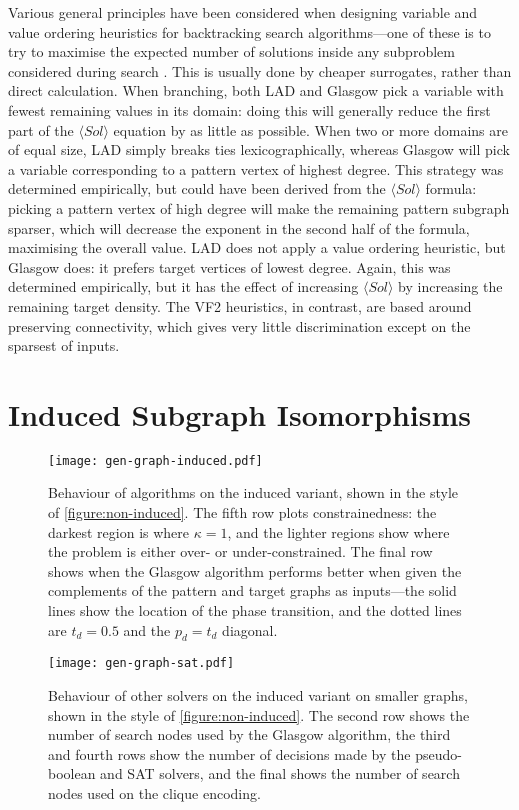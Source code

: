 \documentclass[twoside,11pt]{article}
\newcommand{\citep}[1]{\cite{#1}}
\begin{document}
Various general principles have been considered when designing variable and value ordering
heuristics for backtracking search algorithms---one of these is to try to maximise the expected
number of solutions inside any subproblem considered during search \citep{Gent:1996:EN}.  This is
usually done by cheaper surrogates, rather than direct calculation. When branching, both LAD and
Glasgow pick a variable with fewest remaining values in its domain: doing this will generally reduce
the first part of the $\langle Sol \rangle$ equation by as little as possible. When two or more
domains are of equal size, LAD simply breaks ties lexicographically, whereas Glasgow will pick a
variable corresponding to a pattern vertex of highest degree. This strategy was determined
empirically, but could have been derived from the $\langle Sol \rangle$ formula: picking a pattern
vertex of high degree will make the remaining pattern subgraph sparser, which will decrease the
exponent in the second half of the formula, maximising the overall value. LAD does not apply a value
ordering heuristic, but Glasgow does: it prefers target vertices of lowest degree.  Again, this was
determined empirically, but it has the effect of increasing $\langle Sol \rangle$ by increasing the
remaining target density. The VF2 heuristics, in contrast, are based around preserving connectivity,
which gives very little discrimination except on the sparsest of inputs.

\section{Induced Subgraph Isomorphisms}

\begin{figure}[p]
    \centering\texttt{[image: gen-graph-induced.pdf]}
    \caption{Behaviour of algorithms on the induced variant, shown in the style
    of \cref{figure:non-induced}. The fifth row plots constrainedness: the darkest region is where
    $\kappa = 1$, and the lighter regions show where the problem is either over-
    or under-constrained. The final row shows when the Glasgow algorithm performs better when given
    the complements of the pattern and target graphs as inputs---the solid lines show the location
of the phase transition, and the dotted lines are $t_d=0.5$ and the $p_d=t_d$ diagonal.}\label{figure:induced}
\end{figure}

\begin{figure}[tb]
    \centering\texttt{[image: gen-graph-sat.pdf]}
    \caption{Behaviour of other solvers on the induced variant on smaller graphs, shown in the style of
        \cref{figure:non-induced}. The second row shows the number of search nodes used by the
    Glasgow algorithm, the third and fourth rows show the number of decisions made by the pseudo-boolean
and SAT solvers, and the final shows the number of search nodes used on the clique
encoding.}\label{figure:alt}
\end{figure}
\end{document}
